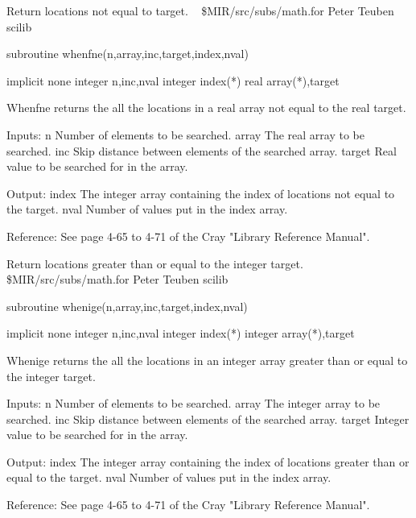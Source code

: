 %
\noindent Return locations not equal to target.
\newline \ 
\newline {} \$MIR/src/subs/math.for
\newline {} Peter Teuben
\newline {} scilib
\par{\tenpoint
{\eightpoint\begintt
        subroutine whenfne(n,array,inc,target,index,nval)

        implicit none
        integer n,inc,nval
        integer index(*)
        real array(*),target

  Whenfne returns the all the locations in a real array not equal to the real
  target.

  Inputs:
    n          Number of elements to be searched.
    array      The real array to be searched.
    inc        Skip distance between elements of the searched array.
    target     Real value to be searched for in the array.

  Output:
    index      The integer array containing the index of locations
               not equal to the target.
    nval       Number of values put in the index array.

  Reference:
  See page 4-65 to 4-71 of the Cray "Library Reference Manual".
\endtt}
\par}
%
\noindent Return locations greater than or equal to the integer target.
\newline \ 
\newline \abox{File:} \$MIR/src/subs/math.for
\newline {} Peter Teuben
\newline \abox{Keywords:} scilib
\par{\tenpoint
{\eightpoint\begintt
        subroutine whenige(n,array,inc,target,index,nval)

        implicit none
        integer n,inc,nval
        integer index(*)
        integer array(*),target

  Whenige returns the all the locations in an integer array greater than or
  equal to the integer target.

  Inputs:
    n          Number of elements to be searched.
    array      The integer array to be searched.
    inc        Skip distance between elements of the searched array.
    target     Integer value to be searched for in the array.

  Output:
    index      The integer array containing the index of locations
               greater than or equal to the target.
    nval       Number of values put in the index array.

  Reference:
  See page 4-65 to 4-71 of the Cray "Library Reference Manual".
\endtt}
\par}
